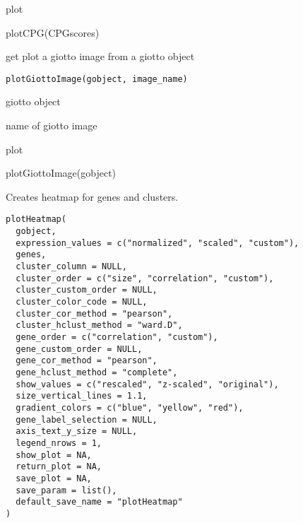 \documentclass[a4paper]{book}
\begin{document}
%
\begin{Value}
plot
\end{Value}
%
\begin{Examples}
\begin{ExampleCode}
    plotCPG(CPGscores)
\end{ExampleCode}
\end{Examples}
%
\begin{Description}\relax
get plot a giotto image from a giotto object
\end{Description}
%
\begin{Usage}
\begin{verbatim}
plotGiottoImage(gobject, image_name)
\end{verbatim}
\end{Usage}
%
\begin{Arguments}
\begin{ldescription}
\item[\code{gobject}] giotto object

\item[\code{image\_name}] name of giotto image 
\end{ldescription}
\end{Arguments}
%
\begin{Value}
plot
\end{Value}
%
\begin{Examples}
\begin{ExampleCode}
    plotGiottoImage(gobject)
\end{ExampleCode}
\end{Examples}
%
\begin{Description}\relax
Creates heatmap for genes and clusters.
\end{Description}
%
\begin{Usage}
\begin{verbatim}
plotHeatmap(
  gobject,
  expression_values = c("normalized", "scaled", "custom"),
  genes,
  cluster_column = NULL,
  cluster_order = c("size", "correlation", "custom"),
  cluster_custom_order = NULL,
  cluster_color_code = NULL,
  cluster_cor_method = "pearson",
  cluster_hclust_method = "ward.D",
  gene_order = c("correlation", "custom"),
  gene_custom_order = NULL,
  gene_cor_method = "pearson",
  gene_hclust_method = "complete",
  show_values = c("rescaled", "z-scaled", "original"),
  size_vertical_lines = 1.1,
  gradient_colors = c("blue", "yellow", "red"),
  gene_label_selection = NULL,
  axis_text_y_size = NULL,
  legend_nrows = 1,
  show_plot = NA,
  return_plot = NA,
  save_plot = NA,
  save_param = list(),
  default_save_name = "plotHeatmap"
)
\end{verbatim}
\end{Usage}
\end{document}
